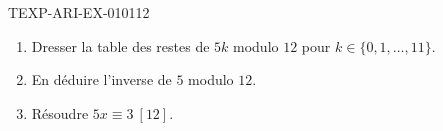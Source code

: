 \begin{exercice}{TEXP-ARI-EX-010}{1}{12}
\begin{enumerate}
  \item Dresser la table des restes de $5k$ modulo $12$ pour
        $k\in\{0,1,\dots,11\}$.
  \item En déduire l'inverse de $5$ modulo $12$.
  \item Résoudre $5x\equiv3\ [12]$.
\end{enumerate}
\end{exercice}
